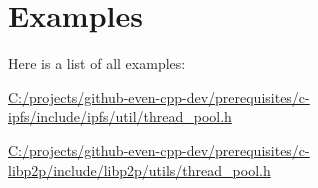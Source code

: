 \section{Examples}
Here is a list of all examples\+:\begin{DoxyCompactItemize}
\item 
\mbox{\hyperlink{_c_1_2projects_2github-even-cpp-dev_2prerequisites_2c-ipfs_2include_2ipfs_2util_2thread_pool_8h-example}{C\+:/projects/github-\/even-\/cpp-\/dev/prerequisites/c-\/ipfs/include/ipfs/util/thread\+\_\+pool.\+h}}
\item 
\mbox{\hyperlink{_c_1_2projects_2github-even-cpp-dev_2prerequisites_2c-libp2p_2include_2libp2p_2utils_2thread_pool_8h-example}{C\+:/projects/github-\/even-\/cpp-\/dev/prerequisites/c-\/libp2p/include/libp2p/utils/thread\+\_\+pool.\+h}}
\end{DoxyCompactItemize}
